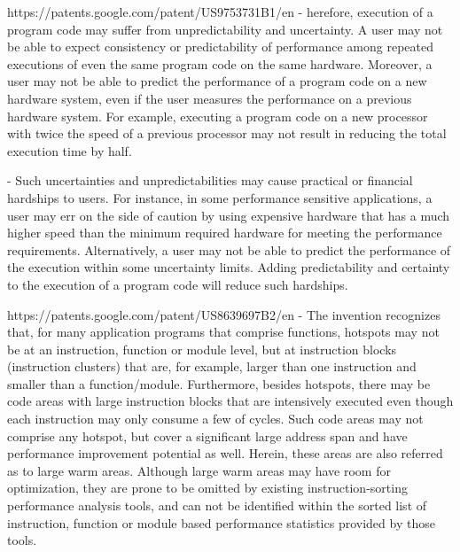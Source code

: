     
https://patents.google.com/patent/US9753731B1/en
    - herefore, execution of a program code may suffer from unpredictability and uncertainty. A user may not be able to expect consistency or predictability of performance among repeated executions of even the same program code on the same hardware. Moreover, a user may not be able to predict the performance of a program code on a new hardware system, even if the user measures the performance on a previous hardware system. For example, executing a program code on a new processor with twice the speed of a previous processor may not result in reducing the total execution time by half.
    
    - Such uncertainties and unpredictabilities may cause practical or financial hardships to users. For instance, in some performance sensitive applications, a user may err on the side of caution by using expensive hardware that has a much higher speed than the minimum required hardware for meeting the performance requirements. Alternatively, a user may not be able to predict the performance of the execution within some uncertainty limits. Adding predictability and certainty to the execution of a program code will reduce such hardships.
    
    
https://patents.google.com/patent/US8639697B2/en
    - The invention recognizes that, for many application programs that comprise functions, hotspots may not be at an instruction, function or module level, but at instruction blocks (instruction clusters) that are, for example, larger than one instruction and smaller than a function/module. Furthermore, besides hotspots, there may be code areas with large instruction blocks that are intensively executed even though each instruction may only consume a few of cycles. Such code areas may not comprise any hotspot, but cover a significant large address span and have performance improvement potential as well. Herein, these areas are also referred as to large warm areas. Although large warm areas may have room for optimization, they are prone to be omitted by existing instruction-sorting performance analysis tools, and can not be identified within the sorted list of instruction, function or module based performance statistics provided by those tools.